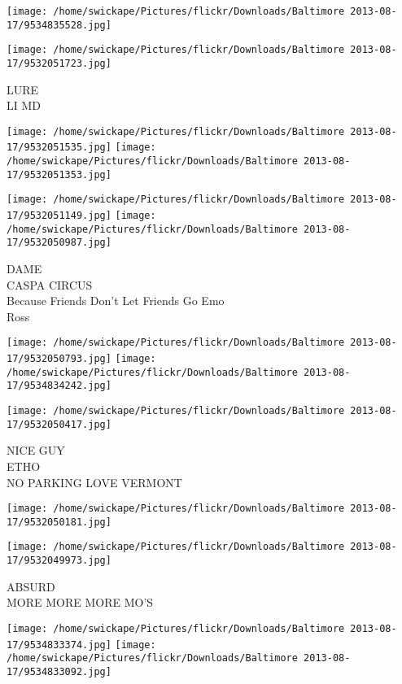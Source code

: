 \documentclass[10pt,letterpaper]{article}
\begin{document}
\texttt{[image: /home/swickape/Pictures/flickr/Downloads/Baltimore 2013-08-17/9534835528.jpg]}

\vspace{0.25in}
\texttt{[image: /home/swickape/Pictures/flickr/Downloads/Baltimore 2013-08-17/9532051723.jpg]}

LURE\\
LI MD\\
\pagebreak

\texttt{[image: /home/swickape/Pictures/flickr/Downloads/Baltimore 2013-08-17/9532051535.jpg]}
\texttt{[image: /home/swickape/Pictures/flickr/Downloads/Baltimore 2013-08-17/9532051353.jpg]}

\texttt{[image: /home/swickape/Pictures/flickr/Downloads/Baltimore 2013-08-17/9532051149.jpg]}
\texttt{[image: /home/swickape/Pictures/flickr/Downloads/Baltimore 2013-08-17/9532050987.jpg]}

DAME\\
CASPA CIRCUS\\
Because Friends Don't Let Friends Go Emo\\
Ross\\
\pagebreak

\texttt{[image: /home/swickape/Pictures/flickr/Downloads/Baltimore 2013-08-17/9532050793.jpg]}
\texttt{[image: /home/swickape/Pictures/flickr/Downloads/Baltimore 2013-08-17/9534834242.jpg]}

\vspace{0.25in}
\texttt{[image: /home/swickape/Pictures/flickr/Downloads/Baltimore 2013-08-17/9532050417.jpg]}

NICE GUY\\
ETHO\\
NO PARKING LOVE VERMONT\\
\pagebreak

\texttt{[image: /home/swickape/Pictures/flickr/Downloads/Baltimore 2013-08-17/9532050181.jpg]}

\vspace{0.25in}
\texttt{[image: /home/swickape/Pictures/flickr/Downloads/Baltimore 2013-08-17/9532049973.jpg]}

ABSURD\\
MORE MORE MORE MO'S\\
\pagebreak

\texttt{[image: /home/swickape/Pictures/flickr/Downloads/Baltimore 2013-08-17/9534833374.jpg]}
\texttt{[image: /home/swickape/Pictures/flickr/Downloads/Baltimore 2013-08-17/9534833092.jpg]}
\end{document}
